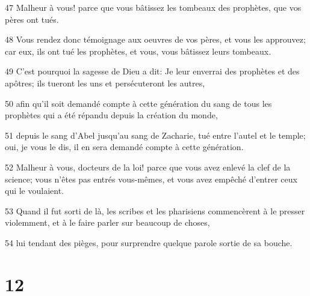 \par 47 Malheur à vous! parce que vous bâtissez les tombeaux des prophètes, que vos pères ont tués.
\par 48 Vous rendez donc témoignage aux oeuvres de vos pères, et vous les approuvez; car eux, ils ont tué les prophètes, et vous, vous bâtissez leurs tombeaux.
\par 49 C'est pourquoi la sagesse de Dieu a dit: Je leur enverrai des prophètes et des apôtres; ils tueront les uns et persécuteront les autres,
\par 50 afin qu'il soit demandé compte à cette génération du sang de tous les prophètes qui a été répandu depuis la création du monde,
\par 51 depuis le sang d'Abel jusqu'au sang de Zacharie, tué entre l'autel et le temple; oui, je vous le dis, il en sera demandé compte à cette génération.
\par 52 Malheur à vous, docteurs de la loi! parce que vous avez enlevé la clef de la science; vous n'êtes pas entrés vous-mêmes, et vous avez empêché d'entrer ceux qui le voulaient.
\par 53 Quand il fut sorti de là, les scribes et les pharisiens commencèrent à le presser violemment, et à le faire parler sur beaucoup de choses,
\par 54 lui tendant des pièges, pour surprendre quelque parole sortie de sa bouche.

\chapter{12}


